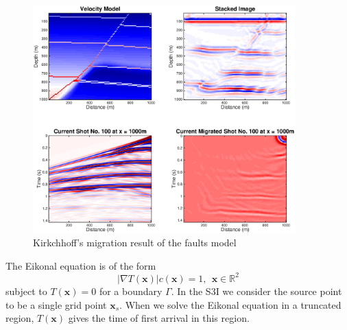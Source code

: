 \documentclass[11pt,titlepage]{article}
\newcommand{\real}{\mathbb{R}}
\newcommand{\bx}{\boldsymbol{x}}
\theoremstyle{plain}
\theoremstyle{definition}
\theoremstyle{remark}
\numberwithin{equation}{section}
\begin{document}
\begin{figure}
\centering
\includegraphics[width=0.9\textwidth]{Fig/kirc.eps}
\caption{Kirkchhoff's migration result of the faults model}
\label{fig:kirc}
\end{figure}

The Eikonal equation is of the form
\begin{equation}
|\nabla T(\bx)| c(\bx)= 1, ~~\bx\in \real^2
\end{equation}
subject to $T(\bx) = 0$ for a boundary $\Gamma$. In the S3I we consider the source point to be a single grid point $\bx_s$. When we solve the Eikonal equation in a truncated region, $T(\bx)$ gives the time of first arrival in this region. 
\end{document}
